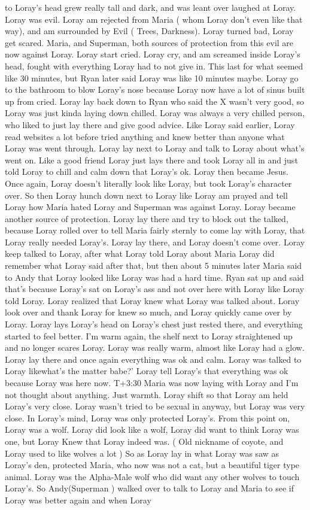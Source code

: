 \documentclass[12pt]{book}
\begin{document}
to Loray's head grew really tall and dark, and was leant over laughed at Loray. Loray was evil. Loray am rejected from Maria ( whom Loray don't even like that way), and am surrounded by Evil ( Trees, Darkness). Loray turned bad, Loray get scared. Maria, and Superman, both sources of protection from this evil are now against Loray. Loray start cried. Loray cry, and am screamed inside Loray's head, fought with everything Loray had to not give in. This last for what seemed like 30 minutes, but Ryan later said Loray was like 10 minutes maybe. Loray go to the bathroom to blow Loray's nose because Loray now have a lot of sinus built up from cried. Loray lay back down to Ryan who said the X wasn't very good, so Loray was just kinda laying down chilled. Loray was always a very chilled person, who liked to just lay there and give good advice. Like Loray said earlier, Loray read websites a lot before tried anything and knew better than anyone what Loray was went through. Loray lay next to Loray and talk to Loray about what's went on. Like a good friend Loray just lays there and took Loray all in and just told Loray to chill and calm down that Loray's ok. Loray then became Jesus. Once again, Loray doesn't literally look like Loray, but took Loray's character over. So then Loray hunch down next to Loray like Loray am prayed and tell Loray how Maria hated Loray and Superman was against Loray. Loray became another source of protection. Loray lay there and try to block out the talked, because Loray rolled over to tell Maria fairly sternly to come lay with Loray, that Loray really needed Loray's. Loray lay there, and Loray doesn't come over. Loray keep talked to Loray, after what Loray told Loray about Maria Loray did remember what Loray said after that, but then about 5 minutes later Maria said to Andy that Loray looked like Loray was had a hard time. Ryan sat up and said that's because Loray's sat on Loray's ass and not over here with Loray like Loray told Loray. Loray realized that Loray knew what Loray was talked about. Loray look over and thank Loray for knew so much, and Loray quickly came over by Loray. Loray lays Loray's head on Loray's chest just rested there, and everything started to feel better. I'm warm again, the shelf next to Loray straightened up and no longer scares Loray. Loray was really warm, almost like Loray had a glow. Loray lay there and once again everything was ok and calm. Loray was talked to Loray likewhat's the matter babe?' Loray tell Loray's that everything was ok because Loray was here now. T+3:30 Maria was now laying with Loray and I'm not thought about anything. Just warmth. Loray shift so that Loray am held Loray's very close. Loray wasn't tried to be sexual in anyway, but Loray was very close. In Loray's mind, Loray was only protected Loray's. From this point on, Loray was a wolf. Loray did look like a wolf, Loray did want to think Loray was one, but Loray Knew that Loray indeed was. ( Old nickname of coyote, and Loray used to like wolves a lot ) So as Loray lay in what Loray was saw as Loray's den, protected Maria, who now was not a cat, but a beautiful tiger type animal. Loray was the Alpha-Male wolf who did want any other wolves to touch Loray's. So Andy(Superman ) walked over to talk to Loray and Maria to see if Loray was better again and when Loray 
\end{document}
